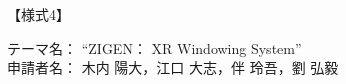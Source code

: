 \documentclass[uplatex]{jsarticle}
\begin{document}
\begin{flushright}
  【様式4】
\end{flushright}
テーマ名： ``ZIGEN： XR Windowing System'' \\
申請者名： 木内 陽大，江口 大志，伴 玲吾，劉 弘毅














\end{document}

